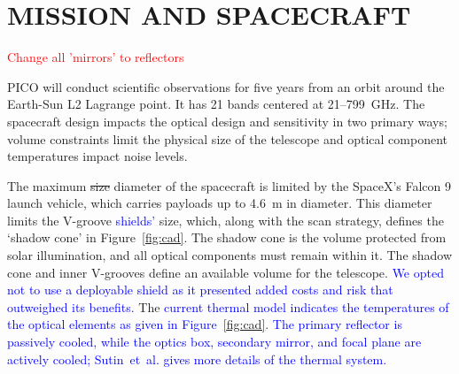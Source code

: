 \documentclass[]{spie}  %
\newcommand{\comr}[1]{\textcolor{red}{#1}}
\newcommand{\comb}[1]{\textcolor{blue}{#1}}
\begin{document}

\section{MISSION AND SPACECRAFT}
\label{sec:spacecraft}

\comr{Change all 'mirrors' to reflectors} 

PICO will conduct scientific observations for five years from an orbit around the Earth-Sun L2 Lagrange point. It has
21 bands centered at 21--799~GHz.  The spacecraft design impacts 
the optical design and sensitivity in two primary ways; volume constraints limit the physical size of the telescope and optical component 
temperatures impact noise levels.  

The maximum \sout{size} diameter of the spacecraft is limited by the SpaceX's Falcon 9 launch vehicle, which carries payloads up to 4.6~m in diameter. 
This diameter limits the V-groove \comb{shields'} size, which, along with the scan strategy, defines the `shadow cone' in Figure~\ref{fig:cad}.  
The shadow cone is the volume protected from solar illumination, and all optical components must remain within it. The shadow cone and 
inner V-grooves define an available volume for the telescope.  \comb{We opted not to use a deployable shield as it presented added costs 
and risk that outweighed its benefits.} The \comb{current thermal model indicates the temperatures of the optical elements as given in Figure~\ref{fig:cad}}. 
\comb{The primary reflector is passively cooled, while the optics box, secondary mirror, and focal plane are actively cooled; Sutin~et~al.\cite{brian_spie}
gives more details of the thermal system.} 
\end{document}
